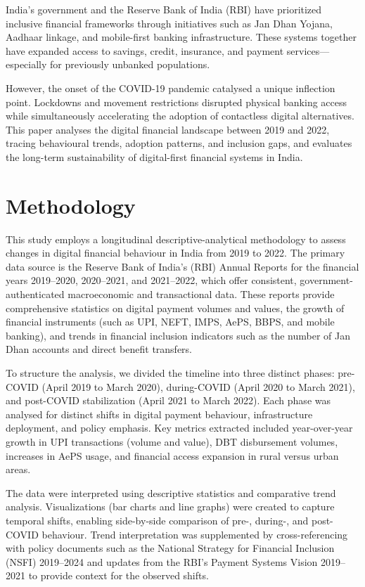 \documentclass[conference]{IEEEtran}
\begin{document}
India's government and the Reserve Bank of India (RBI) have prioritized inclusive financial frameworks through initiatives such as Jan Dhan Yojana, Aadhaar linkage, and mobile-first banking infrastructure. These systems together have expanded access to savings, credit, insurance, and payment services—especially for previously unbanked populations.

However, the onset of the COVID-19 pandemic catalysed a unique inflection point. Lockdowns and movement restrictions disrupted physical banking access while simultaneously accelerating the adoption of contactless digital alternatives. This paper analyses the digital financial landscape between 2019 and 2022, tracing behavioural trends, adoption patterns, and inclusion gaps, and evaluates the long-term sustainability of digital-first financial systems in India.

\section{Methodology}
This study employs a longitudinal descriptive-analytical methodology to assess changes in digital financial behaviour in India from 2019 to 2022. The primary data source is the Reserve Bank of India's (RBI) Annual Reports for the financial years 2019–2020\cite{rbi2019}, 2020–2021\cite{rbi2020}, and 2021–2022\cite{rbi2021}, which offer consistent, government-authenticated macroeconomic and transactional data. These reports provide comprehensive statistics on digital payment volumes and values, the growth of financial instruments (such as UPI, NEFT, IMPS, AePS, BBPS, and mobile banking), and trends in financial inclusion indicators such as the number of Jan Dhan accounts and direct benefit transfers.

To structure the analysis, we divided the timeline into three distinct phases: pre-COVID (April 2019 to March 2020), during-COVID (April 2020 to March 2021), and post-COVID stabilization (April 2021 to March 2022). Each phase was analysed for distinct shifts in digital payment behaviour, infrastructure deployment, and policy emphasis. Key metrics extracted included year-over-year growth in UPI transactions (volume and value), DBT disbursement volumes, increases in AePS usage, and financial access expansion in rural versus urban areas.

The data were interpreted using descriptive statistics and comparative trend analysis. Visualizations (bar charts and line graphs) were created to capture temporal shifts, enabling side-by-side comparison of pre-, during-, and post-COVID behaviour. Trend interpretation was supplemented by cross-referencing with policy documents such as the National Strategy for Financial Inclusion (NSFI) \cite{nsfi} 2019–2024 and updates from the RBI's Payment Systems Vision 2019–2021 to provide context for the observed shifts.
\end{document}
